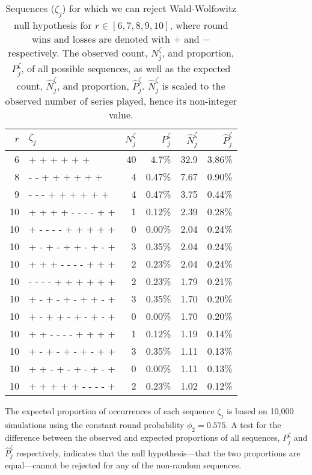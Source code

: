 \documentclass{article}
\begin{document}
\begin{table}

\caption{Sequences ($\zeta_j$) for which we can reject Wald-Wolfowitz null hypothesis for $r \in [6, 7, 8, 9, 10]$, where round wins and losses are denoted with $+$ and $-$ respectively. The observed count, $N^{\zeta}_j$, and proportion, $P^{\zeta}_j$, of all possible sequences, as well as the expected count, $\hat{N}^{\zeta}_j$, and proportion, $\hat{P}^{\zeta}_j$. $\hat{N}^{\zeta}_j$ is scaled to the observed number of series played, hence its non-integer value.}

\centering
\begin{tabular}{rlrrrr}
\toprule
$r$ & $\zeta_j$ & $N^{\zeta}_j$ & $P^{\zeta}_j$ & $\hat{N}^{\zeta}_j$ & $\hat{P}^{\zeta}_j$ \\ 
\midrule
6 & + + + + + + & 40 & 4.7\% & 32.9 & 3.86\% \\
8 & - - + + + + + + & 4 & 0.47\% & 7.67 & 0.90\% \\ 
9 & - - - + + + + + + & 4 & 0.47\% & 3.75 & 0.44\% \\ 
10 & + + + + - - - - + + & 1 & 0.12\% & 2.39 & 0.28\% \\ 
10 & + - - - - + + + + + & 0 & 0.00\% & 2.04 & 0.24\% \\ 
10 & + - + - + + - + - + & 3 & 0.35\% & 2.04 & 0.24\% \\ 
10 & + + + - - - - + + + & 2 & 0.23\% & 2.04 & 0.24\% \\ 
10 & - - - - + + + + + + & 2 & 0.23\% & 1.79 & 0.21\% \\ 
10 & + - + - + - + + - + & 3 & 0.35\% & 1.70 & 0.20\% \\ 
10 & + - + + - + - + - + & 0 & 0.00\% & 1.70 & 0.20\% \\ 
10 & + + - - - - + + + + & 1 & 0.12\% & 1.19 & 0.14\% \\ 
10 & + - + - + - + - + + & 3 & 0.35\% & 1.11 & 0.13\% \\ 
10 & + + - + - + - + - + & 0 & 0.00\% & 1.11 & 0.13\% \\ 
10 & + + + + + - - - - + & 2 & 0.23\% & 1.02 & 0.12\% \\ 

\bottomrule
\end{tabular}

\label{tbl:ww-sequences}
\end{table}

The expected proportion of occurrences of each sequence \(\zeta_j\) is
based on 10,000 simulations using the constant round probability
\(\phi_2 = 0.575\). A test for the difference between the observed and
expected proportions of all sequences, \(P^{\zeta}_j\) and
\(\hat{P}^{\zeta}_j\) respectively, indicates that the null
hypothesis---that the two proportions are equal---cannot be rejected for
any of the non-random sequences.
\end{document}
